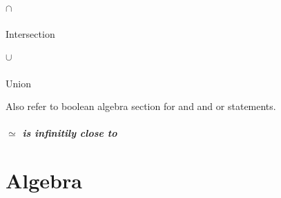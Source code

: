 \documentclass[12pt, a4paper,oneside]{book}
\begin{document}
\paragraph{\(\cap\)}
\begin{paragraph}
Intersection
\end{paragraph}
\paragraph{\(\cup\)}
\begin{paragraph}
Union
\end{paragraph}
Also refer to boolean algebra section for and and or statements.
\paragraph{\(\simeq\) is infinitily close to }

\chapter{Algebra}
\end{document}
